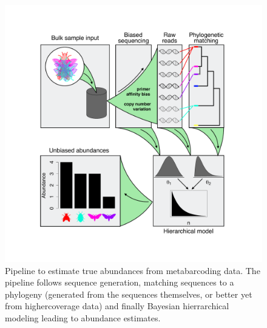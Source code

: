 \documentclass[12pt]{article}
\begin{document}
\begin{figure}[!hbp]
  \centering
  \includegraphics[scale=0.4]{fig_metab.pdf}
  \caption{Pipeline to estimate true abundances from metabarcoding
    data. The pipeline follows sequence generation, matching sequences
    to a phylogeny (generated from the sequences themselves, or better
    yet from highercoverage data) and finally Bayesian hierrarchical
    modeling leading to abundance estimates.}
  \label{fig:abundPipeline}
\end{figure}
\end{document}
